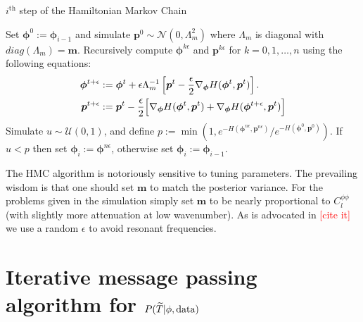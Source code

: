 \documentclass[noinfoline]{imsart}
\newcommand{\bs}{\boldsymbol}
\begin{document}
\begin{algorithm}[H]
\small
\caption{ $i^\text{th}$ step of the Hamiltonian Markov Chain}
\label{ith step of HMC}
\begin{algorithmic}[1]
\State Set $\bs \phi^0:= \bs \phi_{i-1}$ and simulate $\bs p^0 \sim \mathcal N(0,\Lambda_m^2 )$ where $\Lambda_m$ is diagonal with  $diag(\Lambda_m)=\bs m$.
\State  Recursively compute $\bs \phi^{k\epsilon}$ and $\bs p^{k\epsilon}$ for $k=0,1,\ldots, n$ using the following equations:
\begin{align*}
\bs \phi^{t+\epsilon} &:= \bs \phi^{t} + \epsilon \Lambda_m^{-1} \left[ \bs p^t - \frac{\epsilon}{2} \nabla_{\bs \phi} H(\bs \phi^t, \bs p^t) \right]. \\
\bs p^{t+\epsilon} &:= \bs p^{t} - \frac{\epsilon}{2}\Bigl[ \nabla_{\bs \phi} H(\bs \phi^t, \bs p^t) + \nabla_{\bs \phi} H(\bs \phi^{t+\epsilon}, \bs p^t)\Bigr]
\end{align*}
\State Simulate $u\sim \mathcal U(0,1)$, and define $p:= \min\left(1,{e^{- H(\bs \phi^{n\epsilon}, \bs p^{n\epsilon})}}/{e^{-H(\bs \phi^0, \bs p^0)}}\right)$.
\State  If $u< p$ then set $\bs \phi_{i}:= \bs \phi^{n\epsilon}$, otherwise set  $\bs \phi_{i}:= \bs \phi_{i-1}$.
\end{algorithmic}
\end{algorithm}

The HMC algorithm is notoriously sensitive to tuning parameters. 
The prevailing wisdom is that one should set $\bs m$ to match the posterior variance. For the problems given in the simulation simply set  $\bs m$ to be nearly proportional  to $C_l^{\phi\phi}$ (with slightly more attenuation at low wavenumber).  As is advocated in \textcolor{red}{[cite it]} we  use a random $\epsilon$ to avoid resonant frequencies.

%
%
\section{Iterative message passing algorithm for $ P(\widetilde T |  \phi,\text{\rm data})$}
\label{Section: iterative message passing section}
\end{document}
